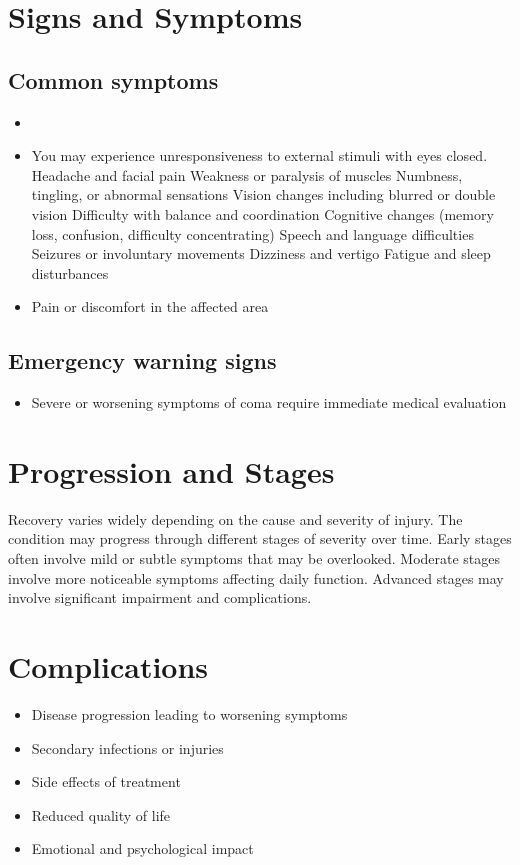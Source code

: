 \section{Signs and Symptoms}

\subsection{Common symptoms}
\begin{itemize}[noitemsep]
  \item \item You may experience unresponsiveness to external stimuli with eyes closed. Headache and facial pain Weakness or paralysis of muscles Numbness, tingling, or abnormal sensations Vision changes including blurred or double vision Difficulty with balance and coordination Cognitive changes (memory loss, confusion, difficulty concentrating) Speech and language difficulties Seizures or involuntary movements Dizziness and vertigo Fatigue and sleep disturbances

  \item Pain or discomfort in the affected area
  \end{itemize}

\subsection{Emergency warning signs}
\begin{itemize}[noitemsep]
  \item Severe or worsening symptoms of coma require immediate medical evaluation
\end{itemize}
\section{Progression and Stages}
Recovery varies widely depending on the cause and severity of injury. The condition may progress through different stages of severity over time. Early stages often involve mild or subtle symptoms that may be overlooked. Moderate stages involve more noticeable symptoms affecting daily function. Advanced stages may involve significant impairment and complications.
\section{Complications}
\begin{itemize}[noitemsep]
  \item Disease progression leading to worsening symptoms
  \item Secondary infections or injuries
  \item Side effects of treatment
  \item Reduced quality of life
  \item Emotional and psychological impact
\end{itemize}
